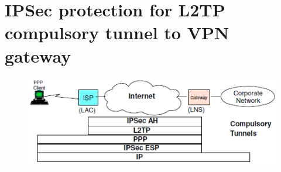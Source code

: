 \documentclass[10pt,a4paper]{article}
\begin{document}
\section{IPSec protection for L2TP compulsory tunnel to VPN gateway}

\begin{figure}[hbtp]
\centering
\includegraphics[scale=1]{IPSec protection for L2TP compulsory tunnel to VPN gateway.png}
\end{figure}
\newpage
\end{document}
